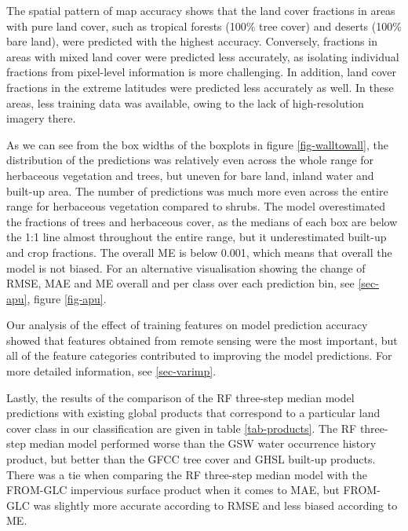 \documentclass[review,authoryear,3p]{elsarticle}
\begin{document}
The spatial pattern of map accuracy shows that the land cover fractions in areas with pure land cover, such as tropical forests (100\% tree cover) and deserts (100\% bare land), were predicted with the highest accuracy.
Conversely, fractions in areas with mixed land cover were predicted less accurately, as isolating individual fractions from pixel-level information is more challenging.
In addition, land cover fractions in the extreme latitudes were predicted less accurately as well.
In these areas, less training data was available, owing to the lack of high-resolution imagery there.

As we can see from the box widths of the boxplots in figure \ref{fig-walltowall}, the distribution of the predictions was relatively even across the whole range for herbaceous vegetation and trees, but uneven for bare land, inland water and built-up area.
The number of predictions was much more even across the entire range for herbaceous vegetation compared to shrubs.
The model overestimated the fractions of trees and herbaceous cover, as the medians of each box are below the 1:1 line almost throughout the entire range, but it underestimated built-up and crop fractions.
The overall \gls{ME} is below 0.001, which means that overall the model is not biased.
For an alternative visualisation showing the change of \gls{RMSE}, \gls{MAE} and \gls{ME} overall and per class over each prediction bin, see \ref{sec-apu}, figure \ref{fig-apu}.

Our analysis of the effect of training features on model prediction accuracy showed that features obtained from remote sensing were the most important, but all of the feature categories contributed to improving the model predictions.
For more detailed information, see \ref{sec-varimp}.

Lastly, the results of the comparison of the \gls{RF} three-step median model predictions with existing global products that correspond to a particular land cover class in our classification are given in table \ref{tab-products}.
The \gls{RF} three-step median model performed worse than the \gls{GSW} water occurrence history product, but better than the \gls{GFCC} tree cover and \gls{GHSL} built-up products.
There was a tie when comparing the \gls{RF} three-step median model with the \gls{FROM-GLC} impervious surface product when it comes to \gls{MAE}, but \gls{FROM-GLC} was slightly more accurate according to \gls{RMSE} and less biased according to \gls{ME}.
\end{document}
